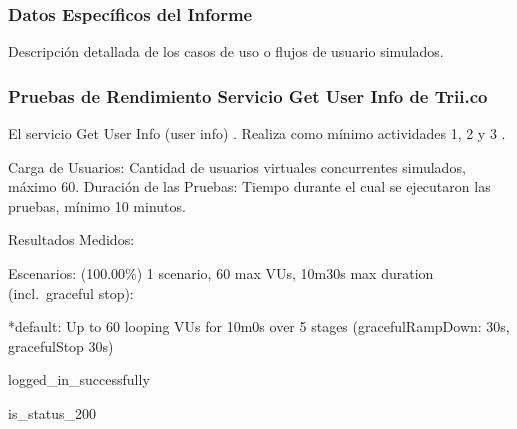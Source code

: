 \documentclass[
  paper=a4,
  ,captions=tableheading
]{scrartcl}
\renewenvironment{quote}{\begin{customblockquote}\list{}{\rightmargin=0em\leftmargin=0em}%
\item\relax\color{blockquote-text}\ignorespaces}{\unskip\unskip\endlist\end{customblockquote}}
\begin{document}
\subsubsection{Datos Específicos del
Informe}\label{sec:datos-especuxedficos-del-informe}

Descripción detallada de los casos de uso o flujos de usuario simulados.

\subsubsection{Pruebas de Rendimiento Servicio Get User Info de
Trii.co}\label{sec:pruebas-de-rendimiento-servicio-get-user-info-de-trii.co}

El servicio Get User Info (user info) . Realiza como mínimo actividades
1, 2 y 3 .

Carga de Usuarios: Cantidad de usuarios virtuales concurrentes
simulados, máximo 60. Duración de las Pruebas: Tiempo durante el cual se
ejecutaron las pruebas, mínimo 10 minutos.

Resultados Medidos:

\begin{quote}
Escenarios: (100.00\%) 1 scenario, 60 max VUs, 10m30s max duration
(incl.~graceful stop):

*default: Up to 60 looping VUs for 10m0s over 5 stages
(gracefulRampDown: 30s, gracefulStop 30s)

logged\_in\_successfully

is\_status\_200
\end{quote}
\end{document}
